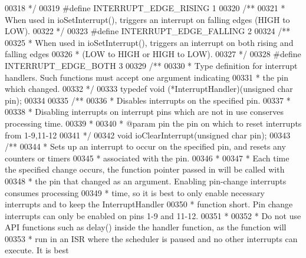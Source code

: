 \begin{DoxyCode}
00318 \textcolor{comment}{ */}
00319 \textcolor{preprocessor}{#}\textcolor{preprocessor}{define} \textcolor{preprocessor}{INTERRUPT\_EDGE\_RISING} 1
00320 \textcolor{comment}{/**}
00321 \textcolor{comment}{ * When used in ioSetInterrupt(), triggers an interrupt on falling edges (HIGH to LOW).}
00322 \textcolor{comment}{ */}
00323 \textcolor{preprocessor}{#}\textcolor{preprocessor}{define} \textcolor{preprocessor}{INTERRUPT\_EDGE\_FALLING} 2
00324 \textcolor{comment}{/**}
00325 \textcolor{comment}{ * When used in ioSetInterrupt(), triggers an interrupt on both rising and falling edges}
00326 \textcolor{comment}{ * (LOW to HIGH or HIGH to LOW).}
00327 \textcolor{comment}{ */}
00328 \textcolor{preprocessor}{#}\textcolor{preprocessor}{define} \textcolor{preprocessor}{INTERRUPT\_EDGE\_BOTH} 3
00329 \textcolor{comment}{/**}
00330 \textcolor{comment}{ * Type definition for interrupt handlers. Such functions must accept one argument indicating}
00331 \textcolor{comment}{ * the pin which changed.}
00332 \textcolor{comment}{ */}
00333 \textcolor{keyword}{typedef} \textcolor{keywordtype}{void} (*InterruptHandler)(\textcolor{keywordtype}{unsigned} \textcolor{keywordtype}{char} pin);
00334 
00335 \textcolor{comment}{/**}
00336 \textcolor{comment}{ * Disables interrupts on the specified pin.}
00337 \textcolor{comment}{ *}
00338 \textcolor{comment}{ * Disabling interrupts on interrupt pins which are not in use conserves processing time.}
00339 \textcolor{comment}{ *}
00340 \textcolor{comment}{ * @param pin the pin on which to reset interrupts from 1-9,11-12}
00341 \textcolor{comment}{ */}
00342 \textcolor{keywordtype}{void} ioClearInterrupt(\textcolor{keywordtype}{unsigned} \textcolor{keywordtype}{char} pin);
00343 \textcolor{comment}{/**}
00344 \textcolor{comment}{ * Sets up an interrupt to occur on the specified pin, and resets any counters or timers}
00345 \textcolor{comment}{ * associated with the pin.}
00346 \textcolor{comment}{ *}
00347 \textcolor{comment}{ * Each time the specified change occurs, the function pointer passed in will be called with}
00348 \textcolor{comment}{ * the pin that changed as an argument. Enabling pin-change interrupts consumes processing}
00349 \textcolor{comment}{ * time, so it is best to only enable necessary interrupts and to keep the InterruptHandler}
00350 \textcolor{comment}{ * function short. Pin change interrupts can only be enabled on pins 1-9 and 11-12.}
00351 \textcolor{comment}{ *}
00352 \textcolor{comment}{ * Do not use API functions such as delay() inside the handler function, as the function will}
00353 \textcolor{comment}{ * run in an ISR where the scheduler is paused and no other interrupts can execute. It is best}

\end{DoxyCode}
